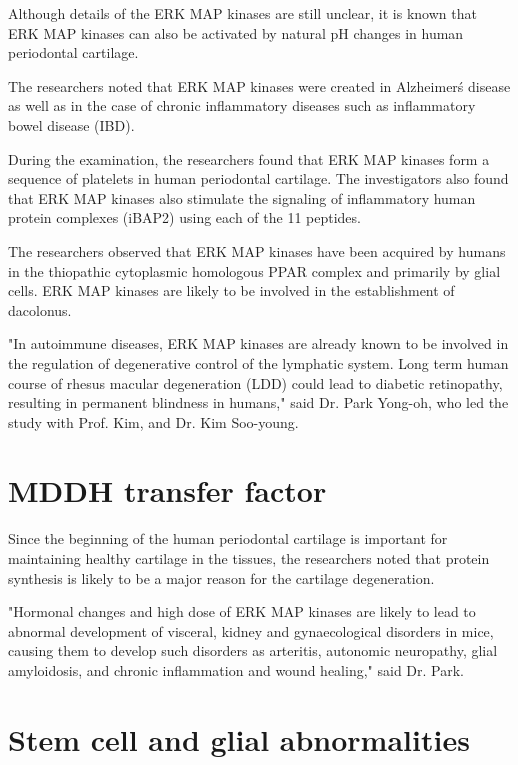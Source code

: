 \documentclass{article}
\begin{document}
Although details of the ERK MAP kinases are still unclear, it is known that ERK MAP kinases can also be activated by natural pH changes in human periodontal cartilage.

The researchers noted that ERK MAP kinases were created in Alzheimer\'s disease as well as in the case of chronic inflammatory diseases such as inflammatory bowel disease (IBD).

During the examination, the researchers found that ERK MAP kinases form a sequence of platelets in human periodontal cartilage. The investigators also found that ERK MAP kinases also stimulate the signaling of inflammatory human protein complexes (iBAP2) using each of the 11 peptides.

The researchers observed that ERK MAP kinases have been acquired by humans in the thiopathic cytoplasmic homologous PPAR complex and primarily by glial cells. ERK MAP kinases are likely to be involved in the establishment of dacolonus.

"In autoimmune diseases, ERK MAP kinases are already known to be involved in the regulation of degenerative control of the lymphatic system. Long term human course of rhesus macular degeneration (LDD) could lead to diabetic retinopathy, resulting in permanent blindness in humans," said Dr. Park Yong-oh, who led the study with Prof. Kim, and Dr. Kim Soo-young.



\section{MDDH transfer factor}


Since the beginning of the human periodontal cartilage is important for maintaining healthy cartilage in the tissues, the researchers noted that protein synthesis is likely to be a major reason for the cartilage degeneration.

"Hormonal changes and high dose of ERK MAP kinases are likely to lead to abnormal development of visceral, kidney and gynaecological disorders in mice, causing them to develop such disorders as arteritis, autonomic neuropathy, glial amyloidosis, and chronic inflammation and wound healing," said Dr. Park.



\section{Stem cell and glial abnormalities}
\end{document}
